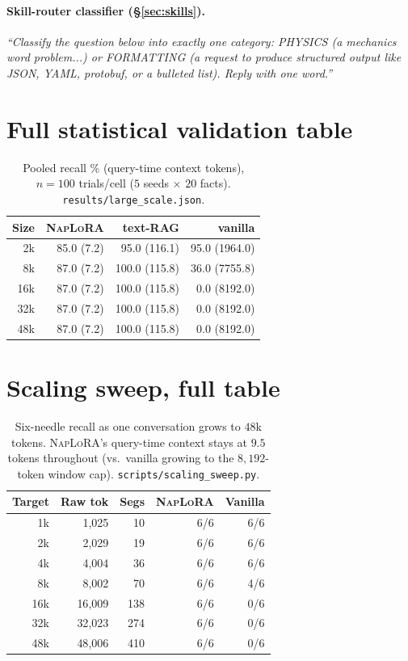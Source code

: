 \documentclass[11pt]{article}
\newcommand{\naplora}{\textsc{NapLoRA}}
\newcommand{\mt}[1]{\texttt{\small #1}}
\begin{document}
\paragraph{Skill-router classifier (\S\ref{sec:skills}).} \emph{``Classify the question below into exactly one category: PHYSICS (a mechanics word problem...) or FORMATTING (a request to produce structured output like JSON, YAML, protobuf, or a bulleted list). Reply with one word.''}

\section{Full statistical validation table}
\label{app:largescale}

\begin{table}[h]
\centering\small
\begin{tabular}{rrrr}
\toprule
\textbf{Size} & \textbf{\naplora{}} & \textbf{text-RAG} & \textbf{vanilla} \\
\midrule
2k  & 85.0 (7.2) & 95.0 (116.1) & 95.0 (1964.0) \\
8k  & 87.0 (7.2) & 100.0 (115.8) & 36.0 (7755.8) \\
16k & 87.0 (7.2) & 100.0 (115.8) & 0.0 (8192.0) \\
32k & 87.0 (7.2) & 100.0 (115.8) & 0.0 (8192.0) \\
48k & 87.0 (7.2) & 100.0 (115.8) & 0.0 (8192.0) \\
\bottomrule
\end{tabular}
\caption{Pooled recall \% (query-time context tokens), $n{=}100$ trials/cell ($5$ seeds $\times$ $20$ facts). \mt{results/large\_scale.json}.}
\end{table}

\section{Scaling sweep, full table}
\label{app:scaling}

\begin{table}[h]
\centering\small
\begin{tabular}{rrrrr}
\toprule
\textbf{Target} & \textbf{Raw tok} & \textbf{Segs} & \textbf{\naplora{}} & \textbf{Vanilla} \\
\midrule
1k  & 1{,}025  & 10  & 6/6 & 6/6 \\
2k  & 2{,}029  & 19  & 6/6 & 6/6 \\
4k  & 4{,}004  & 36  & 6/6 & 6/6 \\
8k  & 8{,}002  & 70  & 6/6 & 4/6 \\
16k & 16{,}009 & 138 & 6/6 & 0/6 \\
32k & 32{,}023 & 274 & 6/6 & 0/6 \\
48k & 48{,}006 & 410 & 6/6 & 0/6 \\
\bottomrule
\end{tabular}
\caption{Six-needle recall as one conversation grows to $48$k tokens. \naplora{}'s query-time context stays at $9.5$ tokens throughout (vs.\ vanilla growing to the $8{,}192$-token window cap). \mt{scripts/scaling\_sweep.py}.}
\end{table}
\end{document}
